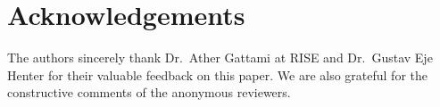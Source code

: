 \documentclass[letterpaper]{article} %
\begin{document}
\section{Acknowledgements}
The authors sincerely thank Dr.~Ather Gattami at RISE and Dr.~Gustav Eje Henter for their valuable feedback on this paper.
We are also grateful for the constructive comments of the anonymous reviewers.
\small


\end{document}
